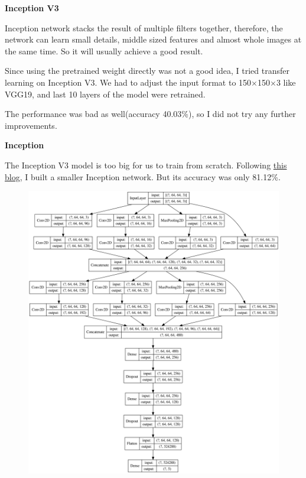 \documentclass[12pt]{article}
\begin{document}
\textbf{Inception V3}

Inception network stacks the result of multiple filters together, therefore, the network can learn small details, middle sized features and almost whole images at the same time. So it will usually achieve a good result.

Since using the pretrained weight directly was not a good idea, I tried transfer learning on Inception V3. We had to adjust the input format to 150$\times$150$\times$3 like VGG19, and last 10 layers of the model were retrained. 

The performance was bad as well(accuracy 40.03\%), so I did not try any further improvements.

\textbf{Inception}

The Inception V3 model is too big for us to train from scratch. Following \href{https://machinelearningmastery.com/how-to-implement-major-architecture-innovations-for-convolutional-neural-networks/}{this blog}, I built a smaller Inception network. But its accuracy was only 81.12\%. 
\begin{figure}[H]
\begin{center}
    \includegraphics[width=1.0\textwidth]{./plots/Inception.png}
\end{center}
\end{figure}
\vspace*{-1.0cm}
\end{document}
